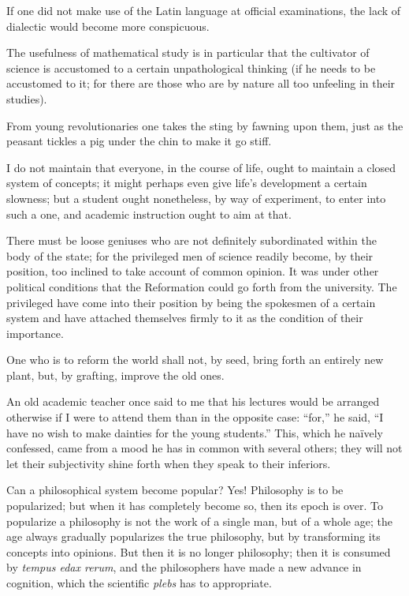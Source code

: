 \documentclass[12pt,a4paper]{article}
\newcommand{\opage}[1]{\marginnote{\footnotesize\textit{[#1]}}}
\newcommand{\aphsep}{\par\smallskip\centerline{\textasteriskcentered}\smallskip}
\begin{document}
\aphsep

If one did not make use of the Latin language at official examinations, the lack
of dialectic would become more conspicuous.

\aphsep

The usefulness of mathematical study is in particular that the cultivator of
science is accustomed to a certain unpathological thinking (if he needs to be
accustomed to it; for there are those who are by nature all too unfeeling in their
studies).

\aphsep

\opage{53}From young revolutionaries one takes the sting by fawning upon them,
just as the peasant tickles a pig under the chin to make it go stiff.

\aphsep

I do not maintain that everyone, in the course of life, ought to maintain a closed
system of concepts; it might perhaps even give life's development a certain
slowness; but a student ought nonetheless, by way of experiment, to enter into
such a one, and academic instruction ought to aim at that.

\aphsep

There must be loose geniuses who are not definitely subordinated within the body of
the state; for the privileged men of science readily become, by their position,
too inclined to take account of common opinion. It was under other political
conditions that the Reformation could go forth from the university. The privileged
have come into their position by being the spokesmen of a certain system and have
attached themselves firmly to it as the condition of their importance.

\aphsep

One who is to reform the world shall not, by seed, bring forth an entirely new
plant, but, by grafting, improve the old ones.

\aphsep

An old academic teacher once said to me that his lectures would be arranged
otherwise if I were to attend them than in the opposite case: ``for,'' he said,
``I have no wish to make dainties for the young students.'' This, which he naïvely
confessed, came from a mood he has in common with several others; they will not
let their subjectivity shine forth when they speak to their inferiors.

\aphsep

\opage{54}Can a philosophical system become popular? Yes! Philosophy is to be
popularized; but when it has completely become so, then its epoch is over. To
popularize a philosophy is not the work of a single man, but of a whole age; the
age always gradually popularizes the true philosophy, but by transforming its
concepts into opinions. But then it is no longer philosophy; then it is consumed
by \textit{tempus edax rerum}, and the philosophers have made a new advance in
cognition, which the scientific \textit{plebs} has to appropriate.
\end{document}

